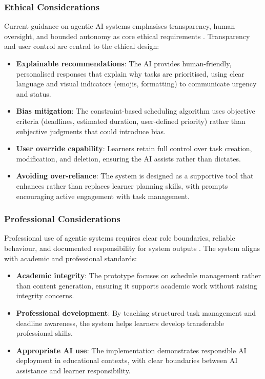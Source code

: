 \documentclass[12pt]{article}
\begin{document}
\subsubsection{Ethical Considerations}
Current guidance on agentic AI systems emphasises transparency, human oversight, and bounded autonomy as core ethical requirements \parencite{shavit2023practices}.
Transparency and user control are central to the ethical design:
\begin{itemize}
    \item \textbf{Explainable recommendations}: The AI provides human-friendly, personalised responses that explain why tasks are prioritised, using clear language and visual indicators (emojis, formatting) to communicate urgency and status.
    \item \textbf{Bias mitigation}: The constraint-based scheduling algorithm uses objective criteria (deadlines, estimated duration, user-defined priority) rather than subjective judgments that could introduce bias.
    \item \textbf{User override capability}: Learners retain full control over task creation, modification, and deletion, ensuring the AI assists rather than dictates.
    \item \textbf{Avoiding over-reliance}: The system is designed as a supportive tool that enhances rather than replaces learner planning skills, with prompts encouraging active engagement with task management.
\end{itemize}

\subsubsection{Professional Considerations}
Professional use of agentic systems requires clear role boundaries, reliable behaviour, and documented responsibility for system outputs \parencite{shavit2023practices}.
The system aligns with academic and professional standards:
\begin{itemize}
    \item \textbf{Academic integrity}: The prototype focuses on schedule management rather than content generation, ensuring it supports academic work without raising integrity concerns.
    \item \textbf{Professional development}: By teaching structured task management and deadline awareness, the system helps learners develop transferable professional skills.
    \item \textbf{Appropriate AI use}: The implementation demonstrates responsible AI deployment in educational contexts, with clear boundaries between AI assistance and learner responsibility.
\end{itemize}
\newpage
{}
\printbibliography
\end{document}
